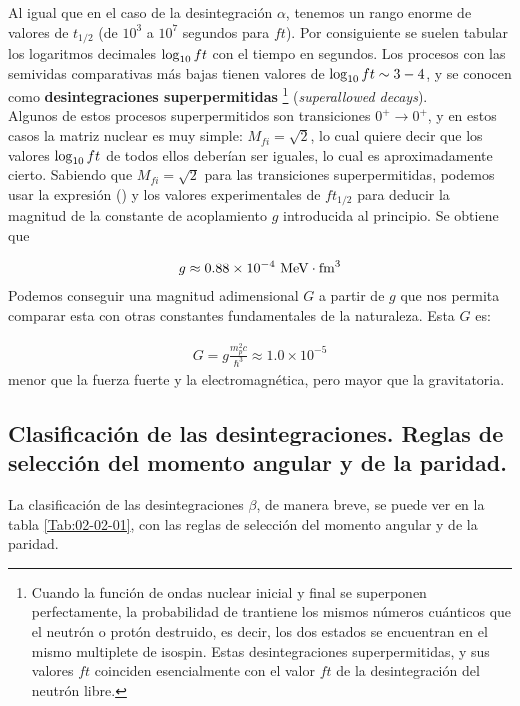 Al igual que en el caso de la desintegración $\alpha$, tenemos un rango enorme de valores de $t_{1/2}$ (de $10^3$ a $10^7$ segundos para $ft$). Por consiguiente se suelen tabular los logaritmos decimales $\log_{10} ft$ con el tiempo en segundos. Los procesos con las semividas comparativas más bajas tienen valores de $\log_{10} ft \sim 3-4$, y se conocen como \textbf{desintegraciones superpermitidas} \footnote{Cuando la función de ondas nuclear inicial y final se superponen perfectamente, la probabilidad de trantiene los mismos números cuánticos que el neutrón o protón destruido, es decir, los dos estados se encuentran en el mismo multiplete de isospin. Estas desintegraciones superpermitidas, y sus valores $ft$ coinciden esencialmente con el valor $ft$ de la desintegración del neutrón libre.} (\textit{superallowed decays}). \\


Algunos de estos procesos superpermitidos son transiciones $0^+ \rightarrow 0^+$, y en estos casos la matriz nuclear es muy simple: $M_{fi}=\sqrt{2}$, lo cual quiere decir que los valores $\log_{10} ft$ de todos ellos deberían ser iguales, lo cual es aproximadamente cierto. Sabiendo que $M_{fi}=\sqrt{2}$ para las transiciones superpermitidas, podemos usar la expresión () y los valores experimentales de $ft_{1/2}$ para deducir la magnitud de la constante de acoplamiento $g$ introducida al principio. Se obtiene que

\begin{eqnarray}
	g\approx 0.88 \times 10^{-4} \ \unit{\MeV\cdot\fm^3}
\end{eqnarray}
Podemos conseguir una magnitud adimensional $G$ a partir de $g$ que nos permita comparar esta con otras constantes fundamentales de la naturaleza. Esta $G$ es:

\begin{eqnarray}
	G= g \frac{m_p ^2 c}{\hbar^3} \approx 1.0 \times 10^{-5}
\end{eqnarray}
menor que la fuerza fuerte y la electromagnética, pero mayor que la gravitatoria. 

\subsection{Clasificación de las desintegraciones. Reglas de selección del momento angular y de la paridad.}

La clasificación de las desintegraciones $\beta$, de manera breve, se puede ver en la tabla \ref{Tab:02-02-01}, con las reglas de selección del momento angular y de la paridad.


